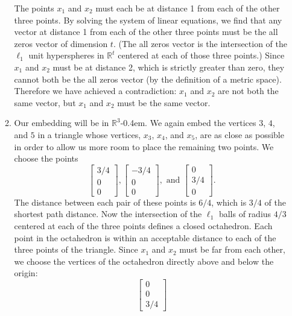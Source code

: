 \documentclass{article}
\newcommand{\R}{\mathbb{R}}
\newcommand{\0}{\mathbf{0}}
\begin{document}
\begin{enumerate}
\begin{enumerate}
        The points $x_1$ and $x_2$ must each be at distance 1 from each of the other three points.
        By solving the system of linear equations, we find that any vector at distance 1 from each of the other three points must be the all zeros vector of dimension $t$.
        (The all zeros vector is the intersection of the $\ell_1$ unit hyperspheres in $\R^t$ centered at each of those three points.)
        Since $x_1$ and $x_2$ must be at distance 2, which is strictly greater than zero, they cannot both be the all zeros vector (by the definition of a metric space).
        Therefore we have achieved a contradiction: $x_1$ and $x_2$ are not both the same vector, but $x_1$ and $x_2$ must be the same vector.

      \item
        Our embedding will be in $\R^3$\kern-0.4em.
        We again embed the vertices $3$, $4$, and $5$ in a triangle whose vertices, $x_3$, $x_4$, and $x_5$, are as close as possible in order to allow us more room to place the remaining two points.
        We choose the points
        \begin{equation*}
          \begin{bmatrix}
            3/4 \\ 0 \\ 0
          \end{bmatrix},
          \begin{bmatrix}
            -3/4 \\ 0 \\ 0
          \end{bmatrix}, \text{ and }
          \begin{bmatrix}
            0 \\ 3/4 \\ 0
          \end{bmatrix}.
        \end{equation*}
        The distance between each pair of these points is $6/4$, which is $3 / 4$ of the shortest path distance.
        Now the intersection of the $\ell_1$ balls of radius $4/3$ centered at each of the three points defines a closed octahedron.
        Each point in the octahedron is within an acceptable distance to each of the three points of the triangle.
        Since $x_1$ and $x_2$ must be far from each other, we choose the vertices of the octahedron directly above and below the origin:
        \begin{equation*}
          \begin{bmatrix}
            0 \\ 0 \\ 3/4

\end{bmatrix}
\end{equation*}
\end{enumerate}
\end{enumerate}
\end{document}
